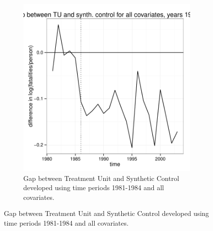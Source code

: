 \documentclass[letterpaper, 12pt]{article}
\begin{document}
\begin{figure}
\begin{centering}
\begin{figure}[htbp]
\begin{center}
\includegraphics{img-gap-full1984.pdf}
\caption{Gap between Treatment Unit and Synthetic Control developed using time periods 1981-1984 and all covariates.}
\label{fig:c12}
\end{center}
\end{figure}


\end{centering}
\end{figure}
\end{document}
